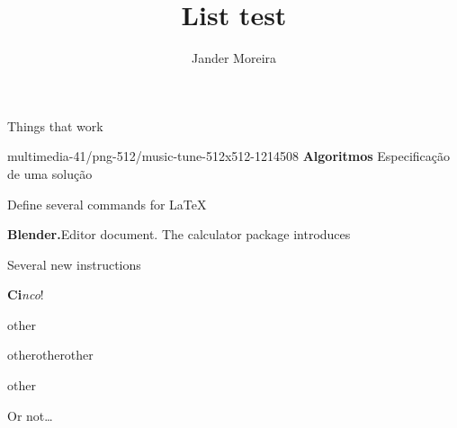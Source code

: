 \documentclass[10pt]{beamer}
\title{List test}
\author{Jander Moreira}
\begin{document}
\maketitle

\begin{frame}
    Things that work

    \hrulefill
    \bigskip
    \small
    \begin{mybox}[columns = 3, equal height = rows, palette = Toasted Peach]
        \item[multimedia-41/png-512/music-tune-512x512-1214508]
        \textbf{Algoritmos}\newline
        Especificação de uma solução
        \item %
        Define several commands for \LaTeX
        \item \textbf{Blender.}\newline Editor document. The calculator package introduces
        \item Several new instructions
        \item \textbf{Ci}\textit{nco}!
        \item other
        \item other\newline other\newline other
        \item other
    \end{mybox}
    \hrulefill

    \bigskip
    Or not\ldots
\end{frame}
\end{document}
